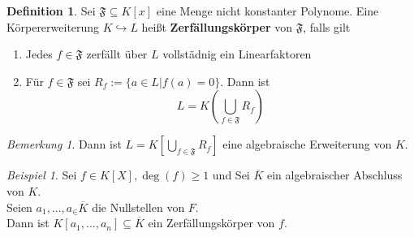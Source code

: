 \documentclass[10pt,a4paper]{article}
\newcommand{\ol}[1]{\overline{#1}}
\newcounter{thm}[section]
\theoremstyle{definition}
\newtheorem{definition}[thm]{Definition}
\theoremstyle{plain}
\theoremstyle{remark}
\newtheorem*{bem*}{Bemerkung}
\newtheorem{exm}[thm]{Beispiel}
\begin{document}
\begin{definition}
	Sei $\mathfrak F\subseteq K[x]$ eine Menge nicht konstanter Polynome. Eine Körpererweiterung $K\hookrightarrow L$ heißt \textbf{Zerfällungskörper} von $\mathfrak F$, falls gilt
	\begin{enumerate}
		\item Jedes $f\in\mathfrak F$ zerfällt über $L$ vollstädnig ein Linearfaktoren
		\item Für $f\in\mathfrak F$ sei $R_f:=\{a\in L|f(a)=0\}$. Dann ist
		\[L=K\left(\bigcup_{f\in \mathfrak F}R_f\right)\]
	\end{enumerate}
\end{definition}
\begin{bem*}
	Dann ist $L=K\left[\bigcup_{f\in \mathfrak F}R_f\right]$ eine algebraische Erweiterung von $K$.
\end{bem*}

\begin{exm}
	Sei $f\in K[X],\deg(f)\geq 1$ und Sei $\ol K$ ein algebraischer Abschluss von $K$.\\
	Seien $a_1,...,a_\in \ol K$ die Nullstellen von $F$.\\
	Dann ist $K[a_1,...,a_n]\subseteq \ol K$ ein Zerfällungskörper von $f$.
\end{exm}
\end{document}
